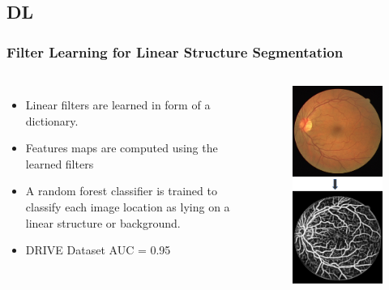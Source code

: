 \documentclass{beamer}
\begin{document}


\subsection{DL}

\begin{frame}
\frametitle{Filter Learning for Linear Structure Segmentation}
\begin{columns}[c] %



\begin{itemize}
\item Linear filters are learned in form of a dictionary.
\item Features maps are computed using the learned filters
\item A random forest classifier is trained to classify each image location as lying on a linear structure or background.
\item DRIVE Dataset AUC = 0.95
\end{itemize}

\begin{figure}
\includegraphics[width=0.6\linewidth]{Images/DL.png}
\end{figure}


\end{columns}
\end{frame}
\end{document}
